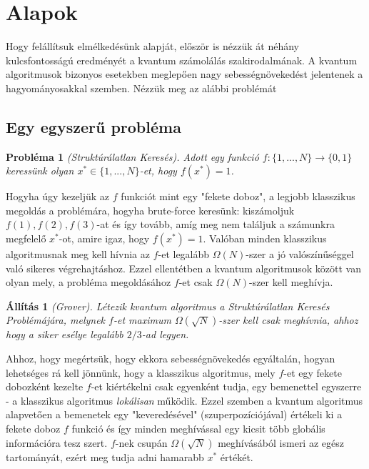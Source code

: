 \chapter{Alapok}\label{sect:Background}
\hspace{2mm} Hogy felállítsuk elmélkedésünk alapját, először is nézzük át néhány kulcsfontosságú eredményét a kvantum számolálás szakirodalmának.
A kvantum algoritmusok bizonyos esetekben meglepően nagy sebességnövekedést jelentenek a hagyományosakkal szemben. Nézzük meg az alábbi problémát

\section{Egy egyszerű probléma}
\vspace{2mm}
\textbf{Probléma 1} \textit{(Struktúrálatlan Keresés). Adott egy funkció $f:\{1,...,N\} \rightarrow \{0,1\}$ keressünk olyan $x^* \in \{1,...,N\}$-et, hogy $f(x^*)=1$.}
\vspace{2mm}

\indent Hogyha úgy kezeljük az $f$ funkciót mint egy "fekete doboz", a legjobb klasszikus megoldás a problémára, hogyha brute-force keresünk: kiszámoljuk $f(1),f(2),f(3)$-at és így tovább, amíg meg nem találjuk a számunkra megfelelő $x^*$-ot, amire igaz, hogy $f(x^*)= 1$.
Valóban minden klasszikus algoritmusnak meg kell hívnia az $f$-et legalább $\Omega(N)$-szer a jó valószínűséggel való sikeres végrehajtáshoz.
Ezzel ellentétben a kvantum algoritmusok között van olyan mely, a probléma megoldásához $f$-et csak $\Omega(N)$-szer kell meghívja.

\vspace{2mm}
\textbf{Állítás 1} \textit{(Grover). Létezik kvantum algoritmus a Struktúrálatlan Keresés Problémájára, melynek $f$-et maximum $\Omega(\sqrt{N})$-szer kell csak meghívnia, ahhoz hogy a siker esélye legalább $2/3$-ad legyen.}
\vspace{2mm}

\indent Ahhoz, hogy megértsük, hogy ekkora sebességnövekedés egyáltalán, hogyan lehetséges rá kell jönnünk, hogy a klasszikus algoritmus, mely $f$-et egy fekete dobozként kezelte $f$-et kiértékelni csak egyenként tudja, egy bemenettel egyszerre - a klasszikus algoritmus \textit{lokálisan} működik.
Ezzel szemben a kvantum algoritmus alapvetően a bemenetek egy "keveredésével" (szuperpozíciójával) értékeli ki a fekete doboz $f$ funkció és így minden meghívással egy kicsit több globális információra tesz szert.
$f$-nek csupán $\Omega(\sqrt{N})$ meghívásából ismeri az egész tartományát, ezért meg tudja adni hamarabb $x^*$ értékét.

